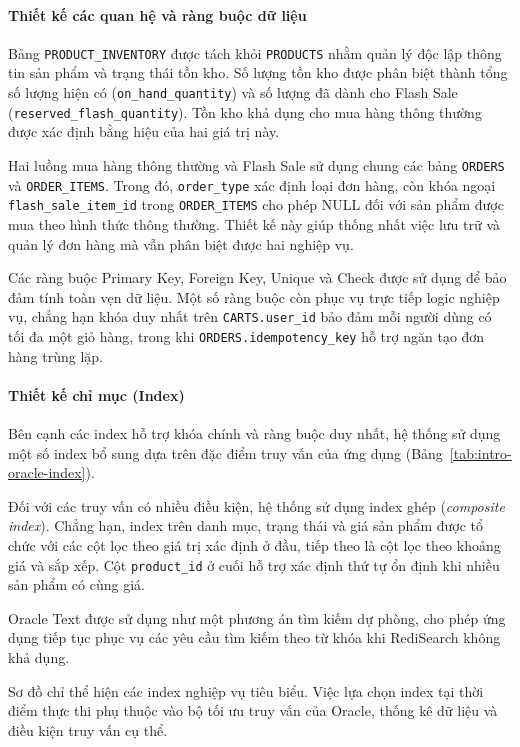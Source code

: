 \paragraph*{Thiết kế các quan hệ và ràng buộc dữ liệu}

Bảng \texttt{PRODUCT\_INVENTORY} được tách khỏi \texttt{PRODUCTS} nhằm quản lý độc lập thông tin sản phẩm và trạng thái tồn kho. Số lượng tồn kho được phân biệt thành tổng số lượng hiện có (\texttt{on\_hand\_quantity}) và số lượng đã dành cho Flash Sale (\texttt{reserved\_flash\_quantity}). Tồn kho khả dụng cho mua hàng thông thường được xác định bằng hiệu của hai giá trị này.

Hai luồng mua hàng thông thường và Flash Sale sử dụng chung các bảng \texttt{ORDERS} và \texttt{ORDER\_ITEMS}. Trong đó, \texttt{order\_type} xác định loại đơn hàng, còn khóa ngoại \texttt{flash\_sale\_item\_id} trong \texttt{ORDER\_ITEMS} cho phép NULL đối với sản phẩm được mua theo hình thức thông thường. Thiết kế này giúp thống nhất việc lưu trữ và quản lý đơn hàng mà vẫn phân biệt được hai nghiệp vụ.

Các ràng buộc Primary Key, Foreign Key, Unique và Check được sử dụng để bảo đảm tính toàn vẹn dữ liệu. Một số ràng buộc còn phục vụ trực tiếp logic nghiệp vụ, chẳng hạn khóa duy nhất trên \texttt{CARTS.user\_id} bảo đảm mỗi người dùng có tối đa một giỏ hàng, trong khi \texttt{ORDERS.idempotency\_key} hỗ trợ ngăn tạo đơn hàng trùng lặp.

\paragraph*{Thiết kế chỉ mục (Index)}

Bên cạnh các index hỗ trợ khóa chính và ràng buộc duy nhất, hệ thống sử dụng một số index bổ sung dựa trên đặc điểm truy vấn của ứng dụng (Bảng~\ref{tab:intro-oracle-index}).

Đối với các truy vấn có nhiều điều kiện, hệ thống sử dụng index ghép (\emph{composite index}). Chẳng hạn, index trên danh mục, trạng thái và giá sản phẩm được tổ chức với các cột lọc theo giá trị xác định ở đầu, tiếp theo là cột lọc theo khoảng giá và sắp xếp. Cột \texttt{product\_id} ở cuối hỗ trợ xác định thứ tự ổn định khi nhiều sản phẩm có cùng giá.

Oracle Text được sử dụng như một phương án tìm kiếm dự phòng, cho phép ứng dụng tiếp tục phục vụ các yêu cầu tìm kiếm theo từ khóa khi RediSearch không khả dụng.

Sơ đồ chỉ thể hiện các index nghiệp vụ tiêu biểu. Việc lựa chọn index tại thời điểm thực thi phụ thuộc vào bộ tối ưu truy vấn của Oracle, thống kê dữ liệu và điều kiện truy vấn cụ thể.

